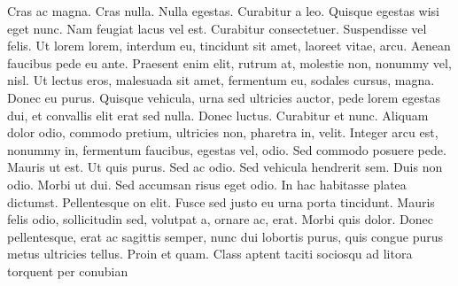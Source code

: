 Cras ac magna. Cras nulla. Nulla egestas. Curabitur a leo. Quisque
egestas wisi eget nunc. Nam feugiat lacus vel est. Curabitur consectetuer.
Suspendisse vel felis. Ut lorem lorem, interdum eu, tincidunt sit amet, laoreet
vitae, arcu. Aenean faucibus pede eu ante. Praesent enim elit, rutrum at,
molestie non, nonummy vel, nisl. Ut lectus eros, malesuada sit amet, fermentum
eu, sodales cursus, magna. Donec eu purus. Quisque vehicula, urna sed ultricies
auctor, pede lorem egestas dui, et convallis elit erat sed nulla. Donec luctus.
Curabitur et nunc. Aliquam dolor odio, commodo pretium, ultricies non, pharetra
in, velit. Integer arcu est, nonummy in, fermentum faucibus, egestas vel, odio.
Sed commodo posuere pede. Mauris ut est. Ut quis purus. Sed ac odio. Sed
vehicula hendrerit sem. Duis non odio. Morbi ut dui. Sed accumsan risus eget
odio. In hac habitasse platea dictumst. Pellentesque on elit. Fusce sed justo eu
urna porta tincidunt. Mauris felis odio, sollicitudin sed, volutpat a, ornare
ac, erat. Morbi quis dolor. Donec pellentesque, erat ac sagittis semper, nunc
dui lobortis purus, quis congue purus metus ultricies tellus. Proin et quam.
Class aptent taciti sociosqu ad litora torquent per conubian






\sectionend
